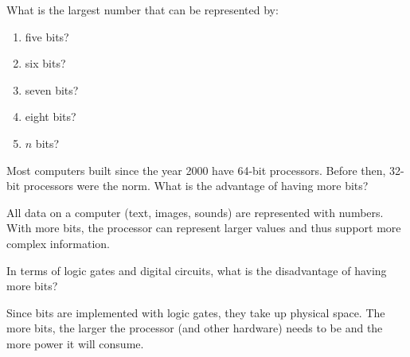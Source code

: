 \Q What is the largest number that can be represented by:

\setlength{\defaultwidth}{4em}

\begin{multicols}{2}
\begin{enumerate}
\item five bits? 
\item six bits? 
\item seven bits? 
\item eight bits? 
\item $n$ bits? 
\end{enumerate}
\end{multicols}


\Q Most computers built since the year 2000 have 64-bit processors.
Before then, 32-bit processors were the norm.
What is the advantage of having more bits?

\begin{answer}
All data on a computer (text, images, sounds) are represented with numbers.
With more bits, the processor can represent larger values and thus support more complex information.
\end{answer}


\Q In terms of logic gates and digital circuits, what is the disadvantage of having more bits?

\begin{answer}
Since bits are implemented with logic gates, they take up physical space.
The more bits, the larger the processor (and other hardware) needs to be and the more power it will consume.
\end{answer}
